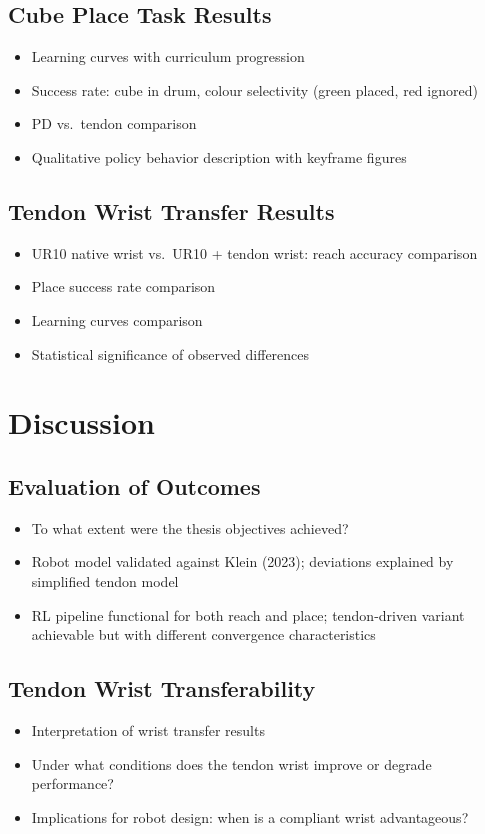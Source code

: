 \section{Cube Place Task Results}
\begin{itemize}
    \item Learning curves with curriculum progression
    \item Success rate: cube in drum, colour selectivity (green placed, red ignored)
    \item PD vs.\ tendon comparison
    \item Qualitative policy behavior description with keyframe figures
\end{itemize}

\section{Tendon Wrist Transfer Results}
\begin{itemize}
    \item UR10 native wrist vs.\ UR10 + tendon wrist: reach accuracy comparison
    \item Place success rate comparison
    \item Learning curves comparison
    \item Statistical significance of observed differences
\end{itemize}

\chapter{Discussion}\label{ch:discussion}

\section{Evaluation of Outcomes}
\begin{itemize}
    \item To what extent were the thesis objectives achieved?
    \item Robot model validated against Klein (2023); deviations explained by simplified tendon model
    \item RL pipeline functional for both reach and place; tendon-driven variant achievable but with different convergence characteristics
\end{itemize}

\section{Tendon Wrist Transferability}
\begin{itemize}
    \item Interpretation of wrist transfer results
    \item Under what conditions does the tendon wrist improve or degrade performance?
    \item Implications for robot design: when is a compliant wrist advantageous?
\end{itemize}

